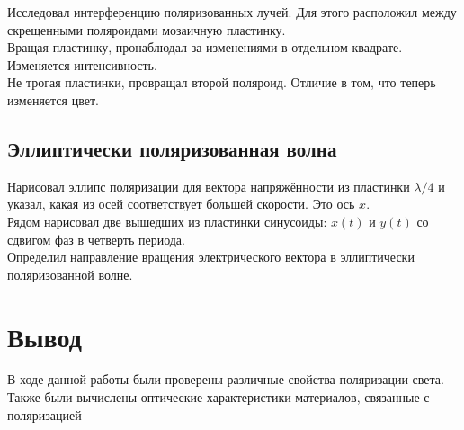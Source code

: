 Исследовал интерференцию поляризованных лучей. Для этого расположил между скрещенными
поляроидами мозаичную пластинку. \\

Вращая пластинку, пронаблюдал за изменениями в отдельном квадрате. Изменяется интенсивность. \\

Не трогая пластинки, провращал второй поляроид. Отличие в том, что теперь изменяется цвет.

\subsection{Эллиптически поляризованная волна}

Нарисовал эллипс поляризации для вектора напряжённости из пластинки $ \lambda/4 $ и указал,
какая из осей соответствует большей скорости. Это ось $ x $. \\

Рядом нарисовал две вышедших из пластинки синусоиды: $ x(t) $ и $ y(t) $ со сдвигом фаз в
четверть периода. \\

Определил направление вращения электрического вектора в эллиптически поляризованной волне.

\begin{center}
\begin{minipage}{7cm}
\end{minipage}
\begin{minipage}{7cm}
\end{minipage}
\end{center}

\section{Вывод}

В ходе данной работы были проверены различные свойства поляризации света. Также были вычислены
оптические характеристики материалов, связанные с поляризацией
